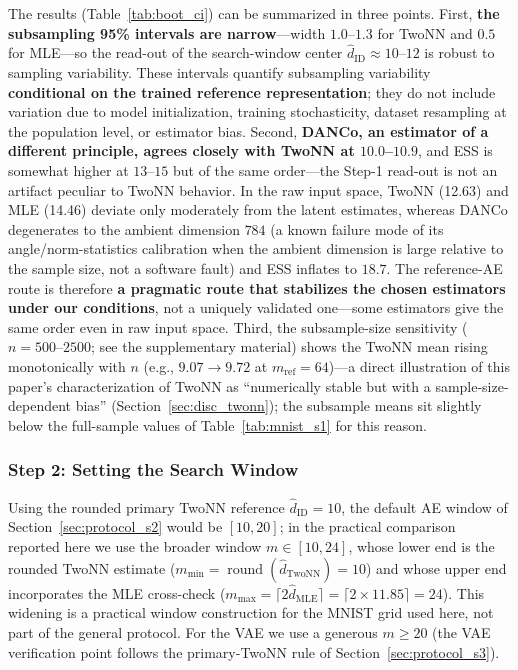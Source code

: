 \documentclass[make,article,submit,pdftex,moreauthors]{Definitions/mdpi}
\newcommand{\hatdID}{\hat{d}_{\mathrm{ID}}}
\begin{document}
The results (Table~\ref{tab:boot_ci}) can be summarized in three points.
First, \textbf{the subsampling 95\% intervals are narrow}---width
$1.0$--$1.3$ for TwoNN and $0.5$ for MLE---so the read-out of the
search-window center $\hatdID \approx 10$--$12$ is robust to sampling
variability.
These intervals quantify subsampling variability \textbf{conditional on the
trained reference representation}; they do not include variation due to
model initialization, training stochasticity, dataset resampling at the
population level, or estimator bias.
Second, \textbf{DANCo, an estimator of a different principle, agrees
closely with TwoNN at $10.0$--$10.9$}, and ESS is somewhat higher at
$13$--$15$ but of the same order---the Step-1 read-out is not an artifact
peculiar to TwoNN behavior.
In the raw input space, TwoNN (12.63) and MLE (14.46) deviate only
moderately from the latent estimates, whereas DANCo degenerates to the
ambient dimension $784$ (a known failure mode of its angle/norm-statistics
calibration when the ambient dimension is large relative to the sample
size, not a software fault) and ESS inflates to $18.7$.
The reference-AE route is therefore \textbf{a pragmatic route that
stabilizes the chosen estimators under our conditions}, not a uniquely
validated one---some estimators give the same order even in raw input
space.
Third, the subsample-size sensitivity ($n = 500$--$2500$; see the
supplementary material) shows the TwoNN mean rising monotonically with $n$
(e.g., $9.07 \to 9.72$ at $m_{\mathrm{ref}} = 64$)---a direct illustration
of this paper's characterization of TwoNN as ``numerically stable but with
a sample-size-dependent bias'' (Section~\ref{sec:disc_twonn}); the
subsample means sit slightly below the full-sample values of
Table~\ref{tab:mnist_s1} for this reason.

\subsubsection{Step 2: Setting the Search Window}

Using the rounded primary TwoNN reference $\hatdID = 10$, the default AE
window of Section~\ref{sec:protocol_s2} would be $[10, 20]$; in the
practical comparison reported here we use the broader window
$m \in [10, 24]$, whose lower end is the rounded TwoNN estimate
($m_{\min} = \operatorname{round}(\hat d_{\mathrm{TwoNN}}) = 10$) and whose
upper end incorporates the MLE cross-check
($m_{\max} = \lceil 2\hat d_{\mathrm{MLE}} \rceil = \lceil 2 \times 11.85
\rceil = 24$).
This widening is a practical window construction for the MNIST grid used
here, not part of the general protocol.
For the VAE we use a generous $m \geq 20$
(the VAE verification point follows the primary-TwoNN rule of
Section~\ref{sec:protocol_s3}).
\end{document}
